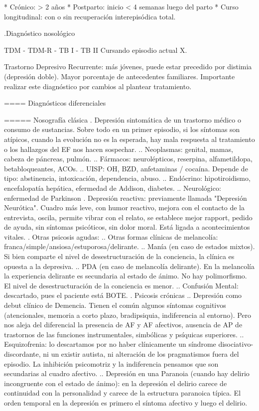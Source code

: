 \documentclass[encares.tex]{subfiles}
\begin{document}
* Crónico: > 2 años
* Postparto: inicio < 4 semanas luego del parto
* Curso longitudinal: con o sin recuperación interepisódica total.

.Diagnóstico nosológico

TDM - TDM-R - TB I - TB II
Cursando episodio actual X.

Trastorno Depresivo Recurrente: más jóvenes, puede estar precedido por distimia (depresión doble). Mayor porcentaje de antecedentes familiares. Importante realizar este diagnóstico por cambios al plantear tratamiento.

==== Diagnósticos diferenciales

===== Nosografía clásica
. Depresión sintomática de un trastorno médico o consumo de sustancias. Sobre todo en un primer episodio, si los síntomas son atípicos, cuando la evolución no es la esperada, hay mala respuesta al tratamiento o los hallazgos del EF nos hacen sospechar.
.. Neoplasmas: genital, mamas, cabeza de páncreas, pulmón.
.. Fármacos: neurolépticos, reserpina, alfametildopa, betabloqueantes, ACOs.
.. UISP: OH, BZD, anfetaminas / cocaína. Depende de tipo: abstinencia, intoxicación, dependencia, abuso.
.. Endócrino: hipotiroidismo, encefalopatía hepática, efermedad de Addison, diabetes.
.. Neurológico: enfermedad de Parkinson
. Depresión reactiva: previamente llamada "Depresión Neurótica". Cuadro más leve, con humor reactivo, mejora con el  contacto de la entrevista, oscila, permite vibrar con el relato, se establece mejor rapport, pedido de ayuda, sin síntomas psicóticos, sin dolor moral. Está ligada a acontecimientos vitales.
. Otras psicosis agudas:
.. Otras formas clínicas de melancolía: franca/simple/ansiosa/estuporosa/delirante.
.. Manía (en caso de estados mixtos). Si bien comparte el nivel de desestructuración de la conciencia, la clínica es opuesta a la depresiva.
.. PDA (en caso de melancolía delirante). En la melancolía la experiencia delirante es secundaria al estado de ánimo. No hay polimorfismo. El nivel de desestructuración de la conciencia es menor.
.. Confusión Mental: descartado, pues el paciente está BOTE.
. Psicosis crónicas
.. Depresión como debut clínico de Demencia. Tienen el común algunos síntomas cognitivos (atencionales, memoria a corto plazo, bradipsiquia, indiferencia al entorno). Pero nos aleja del diferencial la presencia de AF y AF afectivos, ausencia de AP de trastornos de las funciones instrumentales, simbólicas y psíquicas superiores.
.. Esquizofrenia: lo descartamos por no haber clínicamente un síndrome disociativo-discordante, ni un existir autista, ni alteración de los pragmatismos fuera del episodio. La inhibición psicomotriz y la indiferencia pensamos que son secundarias al cuadro afectivo.
.. Depresión en una Paranoia (cuando hay delirio incongruente con el estado de ánimo): en la depresión el delirio carece de continuidad con la personalidad y carece de la estructura paranoica típica. El orden temporal en la depresión es primero el síntoma afectivo y luego el delirio.
\end{document}
